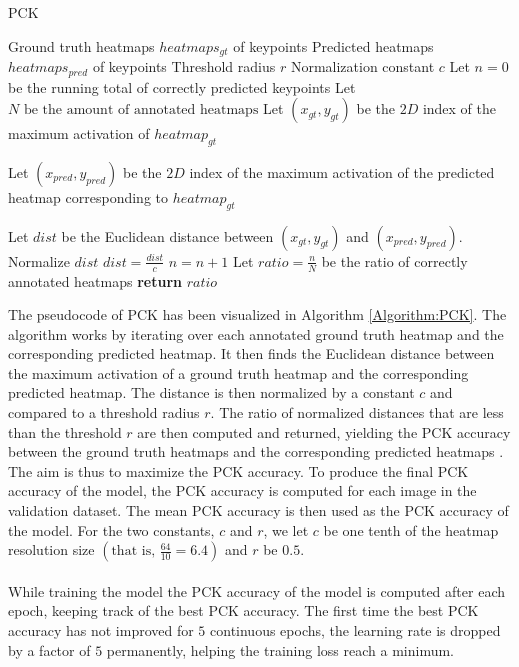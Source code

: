\documentclass[./main.tex]{subfiles}
\begin{document}
\begin{algorithm}[t]
    \caption{PCK \cite{Camilla}\cite{SHG}}
    \label{Algorithm:PCK}
    \begin{algorithmic}[1]
        \Require Ground truth heatmaps $heatmaps_{gt}$ of keypoints
        \Require Predicted heatmaps $heatmaps_{pred}$ of keypoints
        \Require Threshold radius $r$
        \Require Normalization constant $c$
        \State Let $n = 0$ be the running total of correctly predicted keypoints
        \State Let $N \text{ be the amount of annotated heatmaps}$
            \State Let $(x_{gt}, y_{gt})$ be the $2D$ index of the maximum activation of $heatmap_{gt}$
            \State \begin{varwidth}[t]{\linewidth}
                Let $(x_{pred}, y_{pred})$ be the $2D$ index of the maximum activation of the predicted heatmap corresponding to $heatmap_{gt}$
            \end{varwidth}
            \State Let $dist$ be the Euclidean distance between $(x_{gt}, y_{gt})$ and $(x_{pred}, y_{pred})$.
            \State Normalize $dist$ $dist = \frac{dist}{c}$
                \State $n = n + 1$
            \EndIf
        \EndFor
        \State Let $ratio = \frac{n}{N}$ be the ratio of correctly annotated heatmaps
        \State \textbf{return} $ratio$
    \end{algorithmic}
\end{algorithm}
The pseudocode of PCK has been visualized in Algorithm \ref{Algorithm:PCK}. The algorithm works by iterating over each annotated ground truth heatmap and the corresponding predicted heatmap. It then finds the Euclidean distance between the maximum activation of a ground truth heatmap and the corresponding predicted heatmap. The distance is then normalized by a constant $c$ and compared to a threshold radius $r$. The ratio of normalized distances that are less than the threshold $r$ are then computed and returned, yielding the PCK accuracy between the ground truth heatmaps and the corresponding predicted heatmaps \cite{Camilla} \cite{SHG}. The aim is thus to maximize the PCK accuracy. To produce the final PCK accuracy of the model, the PCK accuracy is computed for each image in the validation dataset. The mean PCK accuracy is then used as the PCK accuracy of the model. For the two constants, $c$ and $r$, we let $c$ be one tenth of the heatmap resolution size $\left(\text{that is, }\frac{64}{10} = 6.4 \right)$ and $r$ be $0.5$.
\\
\\
While training the model the PCK accuracy of the model is computed after each epoch, keeping track of the best PCK accuracy. The first time the best PCK accuracy has not improved for $5$ continuous epochs, the learning rate is dropped by a factor of $5$ permanently, helping the training loss reach a minimum.
\end{document}

